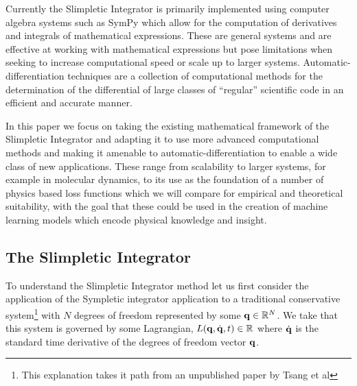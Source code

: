 \documentclass[10pt]{iopart}
\def\SI{Slimpletic Integrator}
\def\SymI{{Sympletic integrator}}
\def\autodiff{automatic-differentiation}
\begin{document}
Currently the \SI{} is primarily implemented using computer algebra systems such as SymPy\cite{sympy} which allow for the computation of derivatives and integrals of mathematical expressions. These are general systems and are effective at working with mathematical expressions but pose limitations when seeking to increase computational speed or scale up to larger systems. Automatic-differentiation  techniques are a collection of computational methods for the determination of the differential of large classes of \enquote{regular} scientific code in an efficient and accurate manner.

In this paper we focus on taking the existing mathematical framework of the \SI{} and adapting it to use more advanced computational methods and making it amenable to \autodiff{} to enable a wide class of new applications. These range from scalability to larger systems, for example in molecular dynamics, to its use as the foundation of a number of physics based loss functions which we will compare for empirical and theoretical suitability, with the goal that these could be used in the creation of machine learning models which encode physical knowledge and insight.


\subsection{The \SI}


To understand the \SI{} method let us first consider the application of the \SymI{} application to a traditional conservative system\footnote{This explanation takes it path from an unpublished paper by Tsang et al\cite{tsangVariationalSymplecticIntegrators}} with $N$ degrees of freedom represented by some $\vb{q} \in \mathbb{R}^N$. We take that this system is governed by some Lagrangian, $L(\vb{q}, \dot{\vb q}, t) \in \mathbb{R}$ where $\dot{\vb q}$ is the standard time derivative of the degrees of freedom vector $\vb q$.
\end{document}
